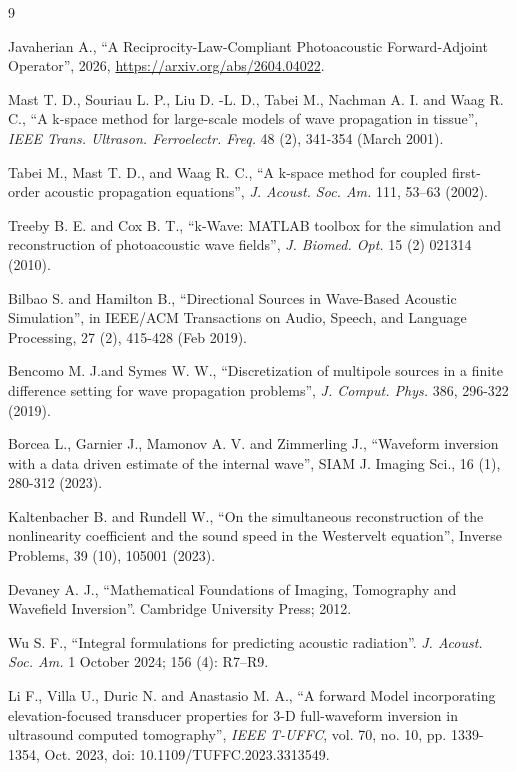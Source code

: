 \documentclass[11pt,reqno]{amsart}
\theoremstyle{remark}
\theoremstyle{italic_lemma}
\begin{document}
\begin{thebibliography}{9}



Javaherian A., “A Reciprocity-Law-Compliant Photoacoustic Forward-Adjoint Operator”, 2026, \url{https://arxiv.org/abs/2604.04022}.


Mast T. D., Souriau L. P.,  Liu D. -L. D., Tabei M., Nachman A. I.  and Waag R. C., “A k-space method for large-scale models of wave propagation in tissue”, \textit{IEEE Trans. Ultrason. Ferroelectr. Freq.} 48 (2), 341-354 (March 2001).

Tabei M., Mast T. D., and Waag R. C., “A k-space method for coupled first-order acoustic propagation equations”, \textit{J. Acoust. Soc. Am.} 111, 53–63  (2002).

Treeby B. E. and Cox B. T., “k-Wave: MATLAB toolbox for the simulation and reconstruction of photoacoustic wave fields”, \textit{J. Biomed. Opt.} 15 (2) 021314 (2010).

Bilbao S. and Hamilton B., “Directional Sources in Wave-Based Acoustic Simulation”, in IEEE/ACM Transactions on Audio, Speech, and Language Processing, 27 (2), 415-428 (Feb 2019).

Bencomo M. J.and Symes W. W., “Discretization of multipole sources in a finite difference setting for wave propagation problems”, \textit{J. Comput. Phys.} 386, 296-322 (2019).  

Borcea L., Garnier J., Mamonov A. V. and Zimmerling J., “Waveform inversion with a data driven estimate of the internal wave”, SIAM J. Imaging Sci., 16 (1), 280-312 (2023).

Kaltenbacher B. and Rundell W., “On the simultaneous reconstruction of the nonlinearity coefficient and the sound speed in the Westervelt equation”,  Inverse Problems, 39 (10), 105001 (2023).

Devaney A. J., “Mathematical Foundations of Imaging, Tomography and Wavefield Inversion”. Cambridge University Press; 2012.

Wu S. F., “Integral formulations for predicting acoustic radiation”. \textit{J. Acoust. Soc. Am.} 1 October 2024; 156 (4): R7–R9.


Li F., Villa U., Duric N. and Anastasio M. A., “A forward Model incorporating elevation-focused transducer properties for 3-D full-waveform inversion in ultrasound computed tomography”, \textit{IEEE T-UFFC}, vol. 70, no. 10, pp. 1339-1354, Oct. 2023, doi: 10.1109/TUFFC.2023.3313549.



\end{thebibliography}
\end{document}
